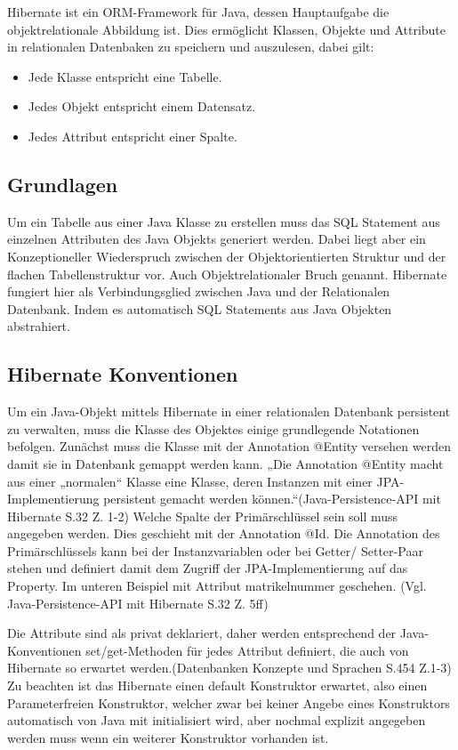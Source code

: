 Hibernate ist ein ORM-Framework für Java, dessen Hauptaufgabe die objektrelationale Abbildung ist. Dies ermöglicht Klassen, Objekte und Attribute in relationalen Datenbaken zu speichern und auszulesen, dabei gilt:

\begin{itemize}
	\item Jede Klasse entspricht eine Tabelle.
	\item Jedes Objekt entspricht einem Datensatz.
	\item Jedes Attribut entspricht einer Spalte.
\end{itemize}

\subsection{Grundlagen}

Um ein Tabelle aus einer Java Klasse zu erstellen muss das SQL Statement aus einzelnen Attributen des Java Objekts generiert werden. Dabei liegt aber ein Konzeptioneller Wiederspruch zwischen der Objektorientierten Struktur und der flachen Tabellenstruktur vor. Auch Objektrelationaler Bruch genannt. Hibernate fungiert hier als Verbindungsglied zwischen Java und der Relationalen Datenbank. Indem es automatisch SQL Statements aus Java Objekten abstrahiert.


\subsection{Hibernate Konventionen}

Um ein Java-Objekt mittels Hibernate in einer relationalen Datenbank persistent zu verwalten, muss die Klasse des Objektes einige grundlegende Notationen befolgen. Zunächst muss die Klasse mit der Annotation @Entity versehen werden damit sie in Datenbank gemappt werden kann. „Die Annotation @Entity macht aus einer „normalen“ Klasse eine Klasse, deren Instanzen mit einer JPA-Implementierung persistent gemacht werden können.“(Java-Persistence-API mit Hibernate S.32 Z. 1-2) Welche Spalte der Primärschlüssel sein soll muss angegeben werden. Dies geschieht mit der Annotation @Id. Die Annotation des Primärschlüssels kann bei der Instanzvariablen oder bei Getter/ Setter-Paar stehen und definiert damit dem Zugriff der JPA-Implementierung auf das Property. Im unteren Beispiel mit Attribut matrikelnummer geschehen. (Vgl. Java-Persistence-API mit Hibernate S.32 Z. 5ff)

Die Attribute sind als privat deklariert, daher werden entsprechend der Java-Konventionen set/get-Methoden für jedes Attribut definiert, die auch von Hibernate so erwartet werden.(Datenbanken Konzepte und Sprachen S.454 Z.1-3) Zu beachten ist das Hibernate einen default Konstruktor erwartet, also einen Parameterfreien Konstruktor, welcher zwar bei keiner Angebe eines Konstruktors automatisch von Java mit initialisiert wird, aber nochmal explizit angegeben werden muss wenn ein weiterer Konstruktor vorhanden ist.

